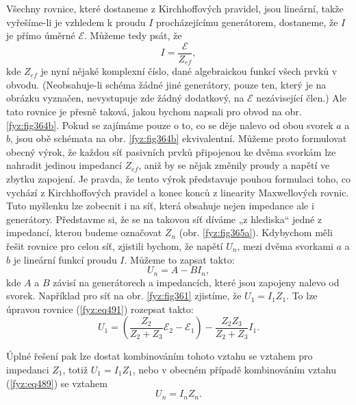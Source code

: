 {  Všechny rovnice, které dostaneme z Kirchhoffových pravidel, jsou lineární, takže vyřešíme-li je 
  vzhledem k proudu \(I\) procházejícímu generátorem, dostaneme, že \(I\) je přímo úměrné 
  \(\mathscr{E}\). Můžeme tedy psát, že
  \begin{equation*}
    I = \frac{\mathscr{E}}{Z_{ef}},
  \end{equation*}
  kde \(Z_{ef}\) je nyní nějaké komplexní číslo, dané algebraickou funkcí všech prvků v obvodu. 
  (Neobsahuje-li schéma žádné jiné generátory, pouze ten, který je na obrázku vyznačen, nevystupuje 
  zde žádný dodatkový, na \(\mathscr{E}\) nezávisející člen.) Ale tato rovnice je přesně taková, 
  jakou bychom napsali pro obvod na obr. \ref{fyz:fig364b}. Pokud se zajímáme pouze o to, co se 
  děje nalevo od obou svorek \(a\) a \(b\), jsou obě schémata na obr. \ref{fyz:fig364b} 
  ekvivalentní. Můžeme proto formulovat obecný výrok, že každou síť pasivních prvků připojenou ke 
  dvěma svorkám lze nahradit jedinou impedancí \(Z_{ef}\), aniž by se nějak změnily proudy a napětí 
  ve zbytku zapojení. Je pravda, že tento výrok představuje pouhou formulaci toho, co vychází z 
  Kirchhoffových pravidel a konec konců z linearity Maxwellových rovnic. Tuto myšlenku lze zobecnit 
  i na síť, která obsahuje nejen impedance ale i generátory. Představme si, že se na takovou síť 
  díváme „z hlediska“ jedné z impedancí, kterou budeme označovat \(Z_n\) (obr. \ref{fyz:fig365a}). 
  Kdybychom měli řešit rovnice pro celou síť, zjistili bychom, že napětí \(U_n\), mezi dvěma 
  svorkami \(a\) a \(b\) je lineární funkcí proudu \(I\). Můžeme to zapsat takto:
  \begin{equation}\label{fyz:eq489}
    U_n = A - BI_n,
  \end{equation}
  kde \(A\) a \(B\) závisí na generátorech a impedancích, které jsou zapojeny nalevo od svorek. 
  Například pro síť na obr. \ref{fyz:fig361} zjistíme, že \(U_1 = I_1Z_1\). To lze úpravou rovnice 
  (\ref{fyz:eq491}) rozepsat takto: 
  \begin{equation}\label{fyz:eq490}
    U_1 = \left(\frac{Z_2}{Z_2 + Z_3}\mathscr{E_2} - \mathscr{E_1}\right) 
         -\frac{Z_2Z_3}{Z_2 + Z_3}I_1.
  \end{equation}
  
  Úplné řešení pak lze dostat kombinováním tohoto vztahu se vztahem pro impedanci \(Z_1\), totiž 
  \(U_1 = I_1Z_1\), nebo v obecném případě kombinováním vztahu (\ref{fyz:eq489}) se vztahem
  \begin{equation*}
    U_n = I_nZ_n.
  \end{equation*}
  
}
